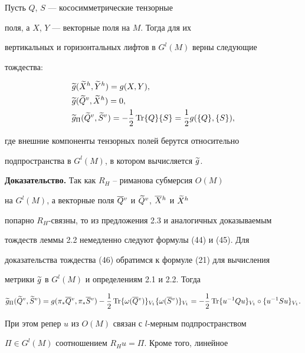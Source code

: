 \begin{lems} Пусть $Q$, $S$ --- кососимметрические тензорные


поля, а $X$, $Y$ --- векторные поля на $M$. Тогда для их


вертикальных и горизонтальных лифтов в $G^l(M)$ верны следующие


тождества:


\begin{align}


&\g g(\grh X,\grh Y)=g(X,Y),\\


&\g g(\grv Q,\grh X)=0,\\


&\g g_\Pi (\grv Q,\grv S)= -\1 \Tr \{ Q\} \{ S\} =\1 g(\{ Q\} , \{ S\}),


\end{align}


где внешние компоненты тензорных полей берутся относительно


подпространства в $G^l(M)$, в котором вычисляется $\widetilde {g}$.


\end{lems}





{\bf Доказательство.} Так как $R_H$ -- риманова субмерсия $O(M)$


на $G^l(M)$, а векторные поля $\overline {Q}{}^v$ и $\widetilde {Q}{}^v$, $\overline {X}{}^h$ и $\widetilde {X}{}^h$


попарно $R_H$-связны, то из предложения 2.3 и аналогичных доказываемым


тождеств леммы 2.2 немедленно следуют формулы (44) и (45). Для


доказательства тождества (46) обратимся к формуле (21) для вычисления


метрики $\widetilde {g}$ в $G^l(M)$ и определениям 2.1 и 2.2. Тогда


$$


\g g_\Pi (\grv Q,\grv S)=g(\pi _*\olv Q,\pi _*\olv S)-\1 \Tr\{ \w (\olv


Q)\}_{V_1}\{ \w (\olv S)\}_{V_1}=


-\1 \Tr \{ u^{-1}Qu\} _{V_1}\circ \{u^{-1}Su\} _{V_1}.


$$




При этом репер $u$ из $O(M)$ связан с $l$-мерным подпространством


$\Pi \in G^l(M)$ соотношением $R_Hu=\Pi $. Кроме того, линейное


